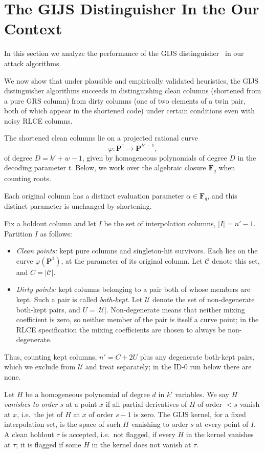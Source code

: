 \section{The GIJS Distinguisher In the Our Context}\label{sec:gijs}
In this section we analyze the performance of the GIJS
distinguisher~\cite{GIJS26} in our attack algorithms.

We now show that under plausible and empirically validated heuristics, the GIJS
distinguisher algorithms succeeds in distinguishing
clean columns (shortened from a pure GRS column) from dirty columns (one of two
elements of a twin pair, both of which appear in the shortened code) under
certain
conditions even with noisy RLCE columns.

The shortened clean columns lie on a projected
rational curve
\[
    \varphi : \mathbf{P}^1 \longrightarrow \mathbf{P}^{k'-1},
\]
of degree $D=k'+w-1$, given by homogeneous polynomials of degree $D$ in the
decoding
parameter $t$. Below, we work over the algebraic closure
$\overline{\mathbf{F}}_q$ when counting roots.

Each original column has a distinct evaluation parameter
$\alpha \in \mathbf{F}_q$, and this distinct parameter is unchanged by
shortening.

Fix a holdout column and let $I$ be the set of interpolation
columns, $|I| = n'-1$. Partition $I$ as follows:
\begin{itemize}
    \item \emph{Clean points:} kept pure columns and singleton-hit
          survivors. Each lies on the curve $\varphi(\mathbf{P}^1)$,
          at the parameter of its original column. Let $\mathcal{C}$
          denote this set, and $C = |\mathcal{C}|$.
    \item \emph{Dirty points:} kept columns belonging to a pair both
          of whose members are kept. Such a pair is called
          \emph{both-kept}. Let $\mathcal{U}$ denote the set of
          non-degenerate both-kept pairs, and $U = |\mathcal{U}|$.
          Non-degenerate means that neither mixing coefficient is zero,
          so neither member of the pair is itself a curve point; in the
          RLCE specification the mixing coefficients are chosen to always
          be non-degenerate.
\end{itemize}
Thus, counting kept columns, $n' = C + 2U$ plus any degenerate
both-kept pairs, which we exclude from $\mathcal{U}$ and treat
separately; in the ID-0 run below there are none.

Let $H$ be a homogeneous polynomial of degree $d$ in $k'$
variables. We say $H$ \emph{vanishes to order $s$} at a point
$x$ if all partial derivatives of $H$ of order $< s$ vanish at $x$,
i.e.\ the jet of $H$ at $x$ of order $s-1$ is zero. The GIJS
kernel, for a fixed interpolation set, is the space of such $H$
vanishing to order $s$ at every point of $I$. A clean holdout
$\tau$ is accepted, i.e.\ not flagged, if every $H$ in the kernel
vanishes at $\tau$; it is flagged if some $H$ in the kernel does
not vanish at $\tau$.

